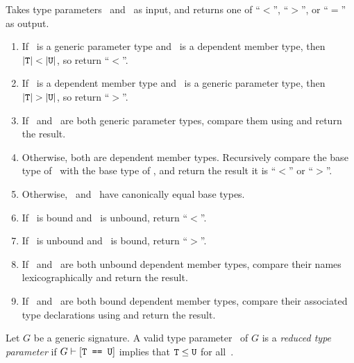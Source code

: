 \documentclass[../generics]{subfiles}
\begin{document}
\begin{algorithm}\label{type parameter order}
Takes type parameters \tT\ and \tU\ as input, and returns one of ``$<$'', ``$>$'', or ``$=$'' as output.
\begin{enumerate}
\item If \tT\ is a generic parameter type and \tU\ is a dependent member type, then $|\tT|<|\tU|$, so return ``$<$''.
\item If \tT\ is a dependent member type and \tU\ is a generic parameter type, then $|\tT|>|\tU|$, so return ``$>$''.
\item If \tT\ and \tU\ are both generic parameter types, compare them using  and return the result.
\item Otherwise, both are dependent member types. Recursively compare the base type of \tT\ with the base type of \tU, and return the result it is ``$<$'' or ``$>$''.

\item Otherwise, \tT\ and \tU\ have canonically equal base types.

\item If \tT\ is bound and \tU\ is unbound, return ``$<$''.
\item If \tT\ is unbound and \tU\ is bound, return ``$>$''.
\item If \tT\ and \tU\ are both unbound dependent member types, compare their names lexicographically and return the result.
\item If \tT\ and \tU\ are both bound dependent member types, compare their associated type declarations using  and return the result.
\end{enumerate}
\end{algorithm}

\begin{definition}
Let $G$ be a generic signature. A valid type parameter \tT\ of $G$ is a \emph{reduced type parameter} if $G\vdash[\texttt{T == U}]$ implies that $\texttt{T}\leq\texttt{U}$ for all~\tU.
\end{definition}
\end{document}
